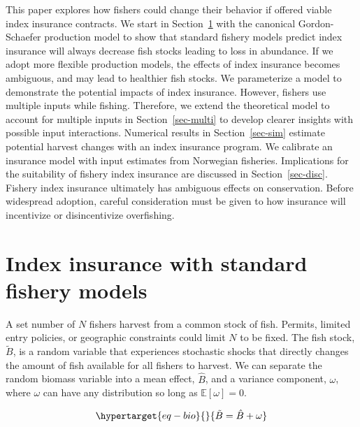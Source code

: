 \documentclass[
  letterpaper,
  DIV=11,
  numbers=noendperiod]{scrartcl}
\theoremstyle{plain}
\theoremstyle{plain}
\theoremstyle{remark}
\begin{document}
This paper explores how fishers could change their behavior if offered
viable index insurance contracts. We start in Section~\ref{sec-common}
with the canonical Gordon-Schaefer production model to show that
standard fishery models predict index insurance will always decrease
fish stocks leading to loss in abundance. If we adopt more flexible
production models, the effects of index insurance becomes ambiguous, and
may lead to healthier fish stocks. We parameterize a model to
demonstrate the potential impacts of index insurance. However, fishers
use multiple inputs while fishing. Therefore, we extend the theoretical
model to account for multiple inputs in Section~\ref{sec-multi} to
develop clearer insights with possible input interactions. Numerical
results in Section~\ref{sec-sim} estimate potential harvest changes with
an index insurance program. We calibrate an insurance model with input
estimates from Norwegian fisheries. Implications for the suitability of
fishery index insurance are discussed in Section~\ref{sec-disc}. Fishery
index insurance ultimately has ambiguous effects on conservation. Before
widespread adoption, careful consideration must be given to how
insurance will incentivize or disincentivize overfishing.

\hypertarget{sec-common}{%
\section{Index insurance with standard fishery
models}\label{sec-common}}

A set number of \(N\) fishers harvest from a common stock of fish.
Permits, limited entry policies, or geographic constraints could limit
\(N\) to be fixed. The fish stock, \(\tilde{B}\), is a random variable
that experiences stochastic shocks that directly changes the amount of
fish available for all fishers to harvest. We can separate the random
biomass variable into a mean effect, \(\hat{B}\), and a variance
component, \(\omega\), where \(\omega\) can have any distribution so
long as \(\mathbb{E}[\omega]=0\).

\begin{equation}\protect\hypertarget{eq-bio}{}{
\tilde{B}=\hat{B}+\omega
}\label{eq-bio}\end{equation}
\end{document}
